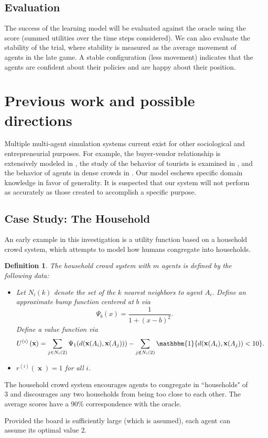\documentclass[10pt]{amsart}
\newtheorem{definition}{Definition}
\theoremstyle{definition}
\DeclareMathOperator{\xx}{\mathbf{x}}
\DeclareMathOperator{\one}{\mathbbm{1}}
\begin{document}
\subsection{Evaluation}

The success of the learning model will be evaluated against the oracle using the score (summed utilities over the time steps considered). We can also evaluate the stability of the trial, where stability is measured as the average movement of agents in the late game. A stable configuration (less movement) indicates that the agents are confident about their policies and are happy about their position.

\section{Previous work and possible directions}

Multiple multi-agent simulation systems current exist for other sociological and entrepreneurial purposes. For example, the buyer-vendor relationship is extensively modeled in \cite{SWARM}, the study of the behavior of tourists is examined in \cite{arrieros}, and the behavior of agents in dense crowds in \cite{DenseSense}. Our model eschews specific domain knowledge in favor of generality. It is suspected that our system will not perform as accurately as those created to accomplish a specific purpose. 

\subsection{Case Study: The Household}

An early example in this investigation is a utility function based on a household crowd system, which attempts to model how humans congregate into households. 

\begin{definition}
The household crowd system with $m$ agents is defined by the following data:
\begin{itemize}
\item Let $N_{i}(k)$ denote the set of the $k$ nearest neighbors to agent $A_i$. Define an approximate bump function centered at $b$ via \[\Psi_{b}(x) = \frac{1}{1+(x-b)^2}.\] Define a value function via \[U^{(i)}\left(\xx\right) = \sum_{j \in N_{i}(2)} \Psi_1(d(\xx(A_i), \xx(A_j))) - \sum_{j \notin N_{i}(2)} \one\{d(\xx(A_i), \xx(A_j)) < 10\}.\] 
\item $r^{(i)}(\xx) = 1$ for all $i$.
\end{itemize}
\end{definition}  

The household crowd system encourages agents to congregate in ``households" of $3$ and discourages any two households from being too close to each other. The average scores have a 90\% correspondence with the oracle.

Provided the board is sufficiently large (which is assumed), each agent can assume its optimal value $2$.



\end{document}
